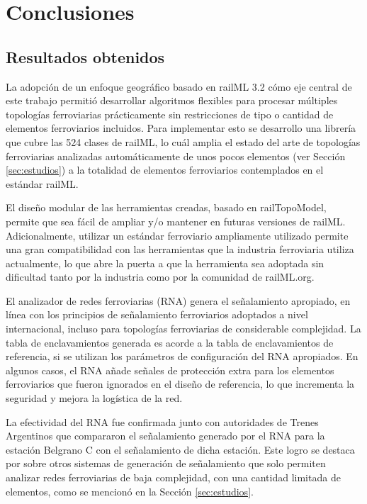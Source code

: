 \chapter{Conclusiones}

\section{Resultados obtenidos}

La adopción de un enfoque geográfico basado en railML 3.2 cómo eje central de este trabajo permitió desarrollar algoritmos flexibles para procesar múltiples topologías ferroviarias prácticamente sin restricciones de tipo o cantidad de elementos ferroviarios incluidos. Para implementar esto se desarrollo una librería que cubre las 524 clases de railML, lo cuál amplia el estado del arte de topologías ferroviarias analizadas automáticamente de unos pocos elementos (ver Sección \ref{sec:estudios}) a la totalidad de elementos ferroviarios contemplados en el estándar railML. 

El diseño modular de las herramientas creadas, basado en railTopoModel, permite que sea fácil de ampliar y/o mantener en futuras versiones de railML. Adicionalmente, utilizar un estándar ferroviario ampliamente utilizado permite una gran compatibilidad con las herramientas que la industria ferroviaria utiliza actualmente, lo que abre la puerta a que la herramienta sea adoptada sin dificultad tanto por la industria como por la comunidad de railML.org.

El analizador de redes ferroviarias (RNA) genera el señalamiento apropiado, en línea con los principios de señalamiento ferroviarios adoptados a nivel internacional, incluso para topologías ferroviarias de considerable complejidad. La tabla de enclavamientos generada es acorde a la tabla de enclavamientos de referencia, si se utilizan los parámetros de configuración del RNA apropiados. En algunos casos, el RNA añade señales de protección extra para los elementos ferroviarios que fueron ignorados en el diseño de referencia, lo que incrementa la seguridad y mejora la logística de la red.

La efectividad del RNA fue confirmada junto con autoridades de Trenes Argentinos que compararon el señalamiento generado por el RNA para la estación Belgrano C con el señalamiento de dicha estación. Este logro se destaca por sobre otros sistemas de generación de señalamiento que solo permiten analizar redes ferroviarias de baja complejidad, con una cantidad limitada de elementos, como se mencionó en la Sección \ref{sec:estudios}.

